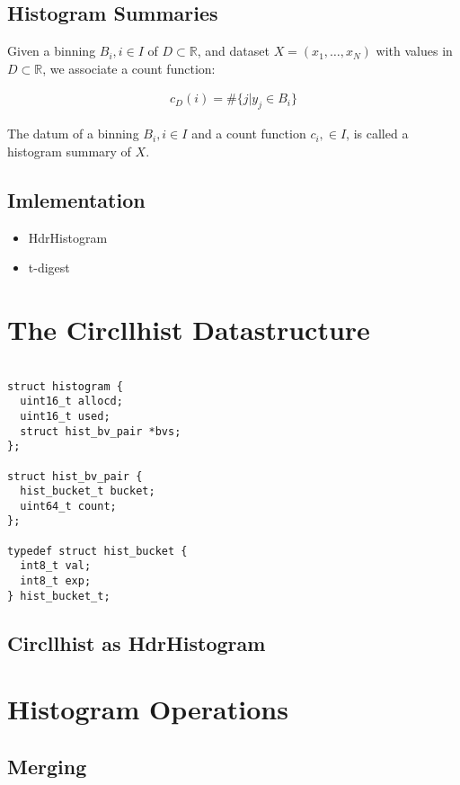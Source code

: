 \documentclass{article}
\theoremstyle{plain}
\newcommand{\IR}{\mathbb{R}}
\begin{document}
\subsection{Histogram Summaries}
Given a binning $B_i, i\in I$ of $D \subset \IR$, and  dataset $X=(x_1,\dots, x_N) $ with values in
$D \subset \IR$, we associate a count function:

\begin{align*} c_D(i) = \# \{ j | y_j \in B_i \} \end{align*}

The datum of a binning $B_i,i\in I$ and a count function $c_i,\in I$, is called a histogram summary of $X$.

\subsection{Imlementation}

\begin{itemize}
\item HdrHistogram
\item t-digest
\end{itemize}

\section{The Circllhist Datastructure}
\begin{verbatim}

struct histogram {
  uint16_t allocd;
  uint16_t used;
  struct hist_bv_pair *bvs;
};

struct hist_bv_pair {
  hist_bucket_t bucket;
  uint64_t count;
};

typedef struct hist_bucket {
  int8_t val;
  int8_t exp;
} hist_bucket_t;
\end{verbatim}

\subsection{Circllhist as HdrHistogram}

\section{Histogram Operations}

\subsection{Merging}
\end{document}
